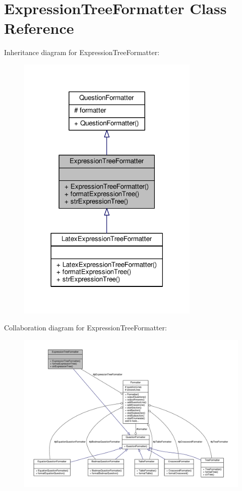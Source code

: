 \hypertarget{classExpressionTreeFormatter}{}\section{Expression\+Tree\+Formatter Class Reference}
\label{classExpressionTreeFormatter}


Inheritance diagram for Expression\+Tree\+Formatter\+:
\nopagebreak
\begin{figure}[H]
\begin{center}
\leavevmode
\includegraphics[width=246pt]{classExpressionTreeFormatter__inherit__graph}
\end{center}
\end{figure}


Collaboration diagram for Expression\+Tree\+Formatter\+:
\nopagebreak
\begin{figure}[H]
\begin{center}
\leavevmode
\includegraphics[width=350pt]{classExpressionTreeFormatter__coll__graph}
\end{center}
\end{figure}
